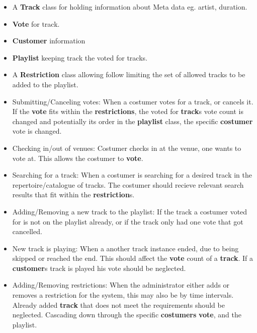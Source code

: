 \begin{itemize}
\item A \textbf{Track} class for holding information about Meta data eg. artist, duration.
\item \textbf{Vote} for track.
\item \textbf{Customer} information
\item \textbf{Playlist} keeping track the voted for tracks.
\item A \textbf{Restriction} class allowing follow limiting the set of allowed tracks to be added to the playlist.
\end{itemize}

\begin{itemize}
\item Submitting/Canceling votes:
    When a costumer votes for a track, or cancels it. If the \textbf{vote} fits within the \textbf{restrictions}, the voted for \textbf{track}s vote count is changed and potentially its order in the \textbf{playlist} class, the specific \textbf{costumer} vote is changed.
\item Checking in/out of venues:
    Costumer checks in at the venue, one wants to vote at. This allows the costumer to \textbf{vote}.
\item Searching for a track:
    When a costumer is searching for a desired track in the repertoire/catalogue of tracks. The costumer should recieve relevant search results that fit within the \textbf{restriction}s.
\item Adding/Removing a new track to the playlist:
    If the track a costumer voted for is not on the playlist already, or if the track only had one vote that got cancelled.
\item New track is playing:
    When a another track instance ended, due to being skipped or reached the end. This should affect the \textbf{vote} count of a \textbf{track}. If a \textbf{customer}s track is played his vote should be neglected.
\item Adding/Removing restrictions:
    When the administrator either adds or removes a restriction for the system, this may also be by time intervals. Already added \textbf{track} that does not meet the requirements should be neglected. Cascading down through the specific \textbf{costumers} \textbf{vote}, and the playlist.
\end{itemize}

